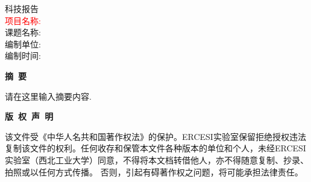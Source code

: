 \documentclass[a4paper, 12pt]{article}
\theoremstyle{definition}
\begin{document}
\renewcommand{\contentsname}{\ \ \ 目录\ \ \ }
\renewcommand{\appendixname}{附录}
\renewcommand{\appendixpagename}{附录}
\renewcommand{\refname}{参考文献} 
\renewcommand{\figurename}{图}
\renewcommand{\tablename}{表}
\renewcommand{\today}{\number\year 年 \number\month 月 \number\day 日}

\renewcommand{\maketitle}{
    \thispagestyle{title}
    \songti %
    \vspace*{94pt}
    \begin{center}
        \fontsize{50pt}{0} 科技报告\\
        \vspace*{300pt}
        \large \textcolor{red}{项目名称: \quad}\ \ \underline{\makebox[300pt]{待填写}}\\
        \large 课题名称: \quad\ \ \underline{\makebox[300pt]{待填写}}\\
        \large 编制单位: \quad\ \ \underline{\makebox[300pt]{待填写}}\\
        \large 编制时间: \quad\ \ \underline{\makebox[300pt]{\today}}

    \end{center}
}

\maketitle


\songti %
\newpage

\begin{center}
{\Large\bf{摘\ 要\\}}
\end{center}
请在这里输入摘要内容.
\newpage
\begin{center}
{\Large\bf{版\ 权\ 声\ 明\\}}
\end{center}
该文件受《中华人名共和国著作权法》的保护。ERCESI实验室保留拒绝授权违法复制该文件的权利。任何收存和保管本文件各种版本的单位和个人，未经ERCESI实验室（西北工业大学）同意，不得将本文档转借他人，亦不得随意复制、抄录、拍照或以任何方式传播。 否则，引起有碍著作权之问题，将可能承担法律责任。\newpage
\begin{center}
\tableofcontents\label{c}
\end{center}
\newpage
\end{document}
